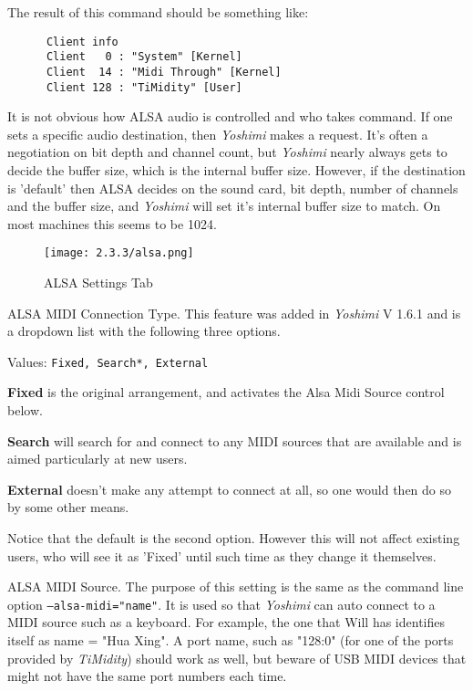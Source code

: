    The result of this command should be something like:

   \begin{verbatim}
      Client info
      Client   0 : "System" [Kernel]
      Client  14 : "Midi Through" [Kernel]
      Client 128 : "TiMidity" [User]
   \end{verbatim}

   It is not obvious how ALSA audio is controlled and who takes command.  If
   one sets a specific audio destination, then \textsl{Yoshimi} makes a
   request.  It's often a negotiation on bit depth and channel count, but
   \textsl{Yoshimi} nearly always gets to decide the buffer size, which is the
   internal buffer size.  However, if the destination is 'default' then ALSA
   decides on the sound card, bit depth, number of channels and the buffer
   size, and \textsl{Yoshimi} will set it's internal buffer size to match.  On
   most machines this seems to be 1024.

\begin{figure}[H]
   \centering
   \texttt{[image: 2.3.3/alsa.png]}
   \caption[ALSA Settings]{ALSA Settings Tab}
   \label{fig:yoshimi_settings_alsa_tab}
\end{figure}

   \setcounter{ItemCounter}{0}      %

   ALSA MIDI Connection Type.
   This feature was added in \textsl{Yoshimi} V 1.6.1 and is a dropdown
   list with the following three options.

   Values: \texttt{Fixed, Search*, External}

   \textbf{Fixed} is the original arrangement, and activates the Alsa Midi Source
   control below.

   \textbf{Search} will search for and connect to any MIDI sources that are
   available and is aimed particularly at new users.

   \textbf{External} doesn't make any attempt to connect at all, so one would
   then do so by some other means.

   Notice that the default is the second option. However this will not affect
   existing users, who will see it as 'Fixed' until such time as they change
   it themselves.

   ALSA MIDI Source.
   The purpose of this setting is the same as the command line option
   \texttt{--alsa-midi="name"}.
   It is used so that \textsl{Yoshimi} can auto connect to a MIDI source
   such as a keyboard.  For example, the one that Will has identifies itself
   as name = "Hua Xing".
   A port name, such as "128:0" (for one of the ports provided by
   \textsl{TiMidity}) should work as well, but beware of USB MIDI devices that
   might not have the same port numbers each time.

